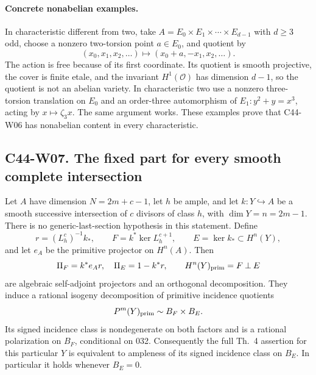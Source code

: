 \paragraph{Concrete nonabelian examples.}
In characteristic different from two, take
$A=E_0\times E_1\times\cdots\times E_{d-1}$ with $d\geq3$ odd,
choose a nonzero two-torsion point $a\in E_0$, and quotient by
\[
 (x_0,x_1,x_2,\ldots)\longmapsto(x_0+a,-x_1,x_2,\ldots).
\]
The action is free because of its first coordinate. Its quotient
is smooth projective, the cover is finite etale, and the invariant
$H^1(\mathcal O)$ has dimension $d-1$, so the quotient is not an
abelian variety. In characteristic two use a nonzero three-torsion
translation on $E_0$ and an order-three automorphism of
$E_1:y^2+y=x^3$, acting by $x\mapsto\zeta_3x$. The same argument
works. These examples prove that C44-W06 has nonabelian content in
every characteristic.

\subsection*{C44-W07. The fixed part for every smooth complete intersection}

\begin{proposition}
Let $A$ have dimension $N=2m+c-1$, let $h$ be ample, and let
$k:Y\hookrightarrow A$ be a smooth successive intersection of
$c$ divisors of class $h$, with $\dim Y=n=2m-1$. There is no
generic-last-section hypothesis in this statement. Define
\[
 r=(L_h^c)^{-1}k_*,\qquad
 F=k^*\ker L_h^{c+1},\qquad E=\ker k_*\subset H^n(Y),
\]
and let $e_A$ be the primitive projector on $H^n(A)$. Then
\[
 \Pi_F=k^*e_A r,\quad \Pi_E=1-k^*r,\qquad
 H^n(Y)_{\rm prim}=F\mathbin\perp E
\]
are algebraic self-adjoint projectors and an orthogonal decomposition.
They induce a rational isogeny decomposition of primitive incidence
quotients
\[
 P^m(Y)_{\rm prim}\sim B_F\times B_E.
\]
Its signed incidence class is nondegenerate on both factors and is
a rational polarization on $B_F$, conditional on 032. Consequently
the full Th.~4 assertion for this particular $Y$ is equivalent to
ampleness of its signed incidence class on $B_E$. In particular it
holds whenever $B_E=0$.
\end{proposition}

